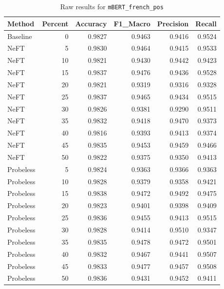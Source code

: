 \documentclass[12pt]{article}
\begin{document}
\begin{table}[H]
\centering
\caption{Raw results for \texttt{mBERT\_french\_pos}}
\label{tab:mbert-french-pos}
\begin{tabular}{lrrrrr}
\toprule
Method & Percent & Accuracy & F1\_Macro & Precision & Recall \\
\midrule
Baseline & 0 & 0.9827 & 0.9463 & 0.9416 & 0.9524 \\
NeFT & 5 & 0.9830 & 0.9464 & 0.9415 & 0.9533 \\
NeFT & 10 & 0.9821 & 0.9430 & 0.9442 & 0.9423 \\
NeFT & 15 & 0.9837 & 0.9476 & 0.9436 & 0.9528 \\
NeFT & 20 & 0.9821 & 0.9319 & 0.9316 & 0.9328 \\
NeFT & 25 & 0.9837 & 0.9465 & 0.9434 & 0.9515 \\
NeFT & 30 & 0.9826 & 0.9381 & 0.9290 & 0.9511 \\
NeFT & 35 & 0.9832 & 0.9418 & 0.9470 & 0.9373 \\
NeFT & 40 & 0.9816 & 0.9393 & 0.9413 & 0.9374 \\
NeFT & 45 & 0.9835 & 0.9453 & 0.9459 & 0.9466 \\
NeFT & 50 & 0.9822 & 0.9375 & 0.9350 & 0.9413 \\
Probeless & 5 & 0.9824 & 0.9363 & 0.9366 & 0.9363 \\
Probeless & 10 & 0.9828 & 0.9379 & 0.9358 & 0.9421 \\
Probeless & 15 & 0.9838 & 0.9472 & 0.9492 & 0.9475 \\
Probeless & 20 & 0.9823 & 0.9401 & 0.9398 & 0.9409 \\
Probeless & 25 & 0.9836 & 0.9455 & 0.9413 & 0.9515 \\
Probeless & 30 & 0.9828 & 0.9414 & 0.9510 & 0.9347 \\
Probeless & 35 & 0.9835 & 0.9478 & 0.9472 & 0.9501 \\
Probeless & 40 & 0.9832 & 0.9467 & 0.9441 & 0.9507 \\
Probeless & 45 & 0.9833 & 0.9477 & 0.9457 & 0.9508 \\
Probeless & 50 & 0.9836 & 0.9431 & 0.9452 & 0.9411 \\
\bottomrule
\end{tabular}
\end{table}
\end{document}

